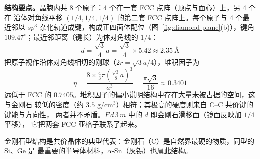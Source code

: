 \textbf{结构要点。}晶胞内共 8 个原子：4 个在一套 FCC 点阵（顶点与面心）上，另 4 个在
沿体对角线平移 $(1/4,1/4,1/4)$ 的第二套 FCC 点阵上。每个原子与 4 个最近邻以 $sp^3$
杂化轨道成键，构成正四面体配位（图~\ref{fig:diamond-plane}(b)），键角
$109.47^\circ$；最近邻距离（键长）为体对角线的 $1/4$：
\begin{equation}
  d=\frac{\sqrt{3}}{4}a=\frac{\sqrt{3}}{4}\times5.42\approx2.35\ \text{\AA}
\end{equation}
把原子视作沿体对角线相切的刚球（$2r=\sqrt{3}a/4$），堆积因子为
\begin{equation}
  \eta=\frac{8\times\frac{4}{3}\pi\left(\frac{\sqrt{3}}{8}a\right)^3}{a^3}
    =\frac{\pi\sqrt{3}}{16}\approx0.3401
\end{equation}
远低于 FCC 的 $0.7405$。堆积因子的偏小说明结构中存在大量未被占据的空间，这与金刚石
较低的密度（约 $3.5$ g/cm$^3$）相符；其极高的硬度则来自 C--C 共价键的键能与方向性，
两者并不矛盾。$F\,d\,\bar3\,m$ 中的 $d$ 即金刚石滑移面（镜面反映加 $1/4$ 平移），
它把两套 FCC 亚格子联系了起来。

金刚石型结构是共价晶体的典型代表：金刚石（C）是自然界最硬的物质，同型的 Si、Ge 是
最重要的半导体材料，$\alpha$-Sn（灰锡）也属此结构。

